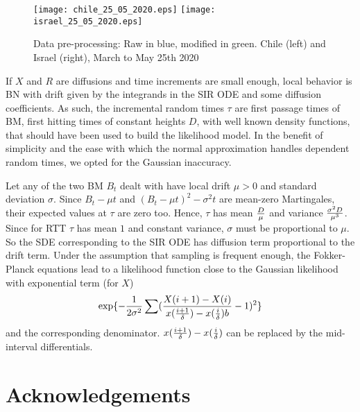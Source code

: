 \documentclass{article}
\begin{document}
\begin{figure}[H]
    \begin{center}
        {\texttt{[image: chile\_25\_05\_2020.eps]}}
        \qquad
        {\texttt{[image: israel\_25\_05\_2020.eps]}}
    \end{center}
    \begin{center}
    \caption{Data pre-processing: Raw in blue, modified in green. Chile (left) and Israel (right), March to May 25th 2020
    }
\label{fig:chile_and_israel_25_05_2020}
    \end{center}
\end{figure}

\newpage


\bigskip

\noindent If $X$ and $R$ are diffusions and time increments are small enough, local behavior is BN with drift given by the integrands in the SIR ODE and some diffusion coefficients. As such, the incremental random times $\tau$ are first passage times of BM, first hitting times of constant heights $D$, with well known density functions, that should have been used to build the likelihood model. In the benefit of simplicity and the ease with which the normal approximation handles dependent random times, we opted for the Gaussian inaccuracy.

\bigskip

\noindent Let any of the two BM $B_t$ dealt with have local drift $\mu>0$ and standard deviation $\sigma$. Since $B_t - \mu t$ and $(B_t - \mu t)^2 - \sigma^2 t$ are mean-zero Martingales, their expected values at $\tau$ are zero too. Hence, $\tau$ has mean ${D \over \mu}$ and variance ${{\sigma^2 D} \over {\mu^3}}$. Since for RTT $\tau$ has mean $1$ and constant variance, $\sigma$ must be proportional to $\mu$. So the SDE corresponding to the SIR ODE has diffusion term proportional to the drift term. Under the assumption that sampling is frequent enough, the Fokker-Planck equations lead to a likelihood function close to the Gaussian likelihood with exponential term (for $X$)
$$
\exp\{-{1 \over {2 \sigma^2}}\sum ({{X(i+1)-X(i)} \over {{x({{i+1} \over \delta})-x({{i} \over \delta})}b}}-1)^2\}
$$
and the corresponding denominator. ${{x({{i+1} \over \delta})-x({{i} \over \delta})}}$ can be replaced by the mid-interval differentials.

\section*{Acknowledgements}
\end{document}

